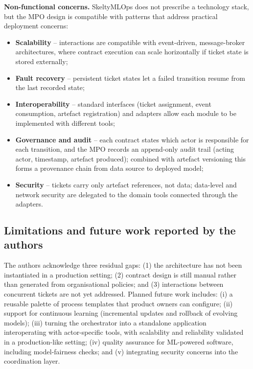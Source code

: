 \documentclass[11pt,a4paper]{article}
\begin{document}
\textbf{Non-functional concerns.}
SkeltyMLOps does not prescribe a technology stack, but the MPO design is compatible with patterns that address practical deployment concerns:
\begin{itemize}
  \item \textbf{Scalability} -- interactions are compatible with event-driven, message-broker architectures, where contract execution can scale horizontally if ticket state is stored externally;
  \item \textbf{Fault recovery} -- persistent ticket states let a failed transition resume from the last recorded state;
  \item \textbf{Interoperability} -- standard interfaces (ticket assignment, event consumption, artefact registration) and adapters allow each module to be implemented with different tools;
  \item \textbf{Governance and audit} -- each contract states which actor is responsible for each transition, and the MPO records an append-only audit trail (acting actor, timestamp, artefact produced); combined with artefact versioning this forms a provenance chain from data source to deployed model;
  \item \textbf{Security} -- tickets carry only artefact references, not data; data-level and network security are delegated to the domain tools connected through the adapters.
\end{itemize}

\subsection{Limitations and future work reported by the authors}

The authors acknowledge three residual gaps: (1) the architecture has not been instantiated in a production setting; (2) contract design is still manual rather than generated from organisational policies; and (3) interactions between concurrent tickets are not yet addressed. Planned future work includes: (i) a reusable palette of process templates that product owners can configure; (ii) support for continuous learning (incremental updates and rollback of evolving models); (iii) turning the orchestrator into a standalone application interoperating with actor-specific tools, with scalability and reliability validated in a production-like setting; (iv) quality assurance for ML-powered software, including model-fairness checks; and (v) integrating security concerns into the coordination layer.
\end{document}
